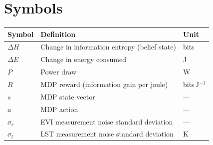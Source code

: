 \section*{Symbols}

\begin{longtable}{p{2.8cm}p{8cm}p{2.5cm}}
  \toprule
  Symbol & Definition & Unit \\
  \midrule\endhead
  $\Delta H$   & Change in information entropy (belief state) & bits \\
  $\Delta E$   & Change in energy consumed & J \\
  $P$          & Power draw & W \\
  $R$          & MDP reward (information gain per joule) & bits\,J$^{-1}$ \\
  $s$          & MDP state vector & --- \\
  $a$          & MDP action & --- \\
  $\sigma_e$   & EVI measurement noise standard deviation & --- \\
  $\sigma_l$   & LST measurement noise standard deviation & K \\
  \bottomrule
\end{longtable}
